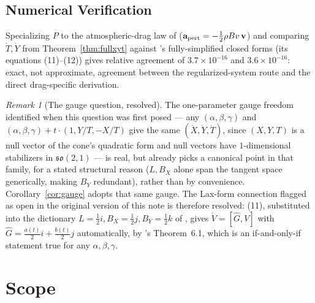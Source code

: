 \documentclass[12pt]{amsart}
\theoremstyle{plain}
\theoremstyle{remark}
\newtheorem*{remark}{Remark}
\begin{document}
\subsection*{Numerical Verification}
Specializing $P$ to the atmospheric-drag law of \cite{Ebert2026Cone} ($\mathbf a_{\rm pert}=-\tfrac12\rho Bv\,\mathbf v$) and comparing $\dot T,\dot Y$ from Theorem~\ref{thm:fullxyt} against \cite{Ebert2026Cone}'s fully-simplified closed forms (its equations (11)--(12)) gives relative agreement of $3.7\times10^{-16}$ and $3.6\times10^{-16}$: exact, not approximate, agreement between the regularized-system route and the direct drag-specific derivation.

\begin{remark}[The gauge question, resolved]
The one-parameter gauge freedom identified when this question was first posed --- any $(\alpha,\beta,\gamma)$ and $(\alpha,\beta,\gamma)+t\cdot(1,Y/T,-X/T)$ give the same $(\dot X,\dot Y,\dot T)$, since $(X,Y,T)$ is a null vector of the cone's quadratic form and null vectors have $1$-dimensional stabilizers in $\mathfrak{so}(2,1)$ --- is real, but \cite{Ebert2026Cone} already picks a canonical point in that family, for a stated structural reason ($L,B_X$ alone span the tangent space generically, making $B_Y$ redundant), rather than by convenience. Corollary~\ref{cor:gauge} adopts that same gauge. The Lax-form connection flagged as open in the original version of this note is therefore resolved: (11), substituted into the dictionary $L=\tfrac12i,B_X=\tfrac12j,B_Y=\tfrac12k$ of \cite{Ebert2026Clock}, gives $\dot V=[\hat G,V]$ with $\hat G=\tfrac{a(t)}2i+\tfrac{b(t)}2j$ automatically, by \cite{Ebert2026Clock}'s Theorem~6.1, which is an if-and-only-if statement true for any $\alpha,\beta,\gamma$.
\end{remark}

\section{Scope}
\end{document}
